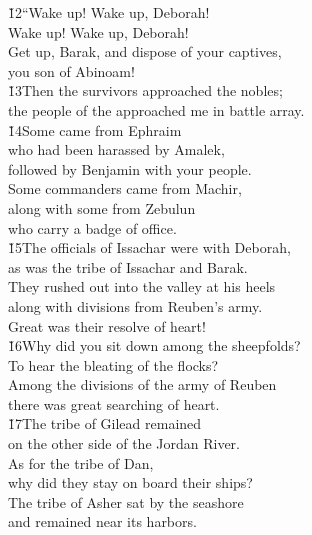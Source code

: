 \begin{poetry}
\poeml \v{12}``Wake up! Wake up, Deborah! \\
\poemll    Wake up! Wake up, Deborah! \\
\poeml Get up, Barak, and dispose of your captives, \\
\poemll    you son of Abinoam! \\
\poeml \v{13}Then the survivors approached the nobles; \\
\poemll    the people of the  approached me in battle array. \\
\poeml \v{14}Some came from Ephraim \\
\poemll    who had been harassed by Amalek, \\
\poemlll       followed by Benjamin with your people. \\
\poeml Some commanders came from Machir, \\
\poemll    along with some from Zebulun \\
\poemlll       who carry a badge of office. \\
\poeml \v{15}The officials of Issachar were with Deborah, \\
\poemll    as was the tribe of Issachar and Barak. \\
\poeml They rushed out into the valley at his heels \\
\poemll    along with divisions from Reuben's army. \\
\poemlll       Great was their resolve of heart! \\
\poeml \v{16}Why did you sit down among the sheepfolds? \\
\poemll    To hear the bleating of the flocks? \\
\poeml Among the divisions of the army of Reuben \\
\poemll    there was great searching of heart. \\
\poeml \v{17}The tribe of Gilead remained \\
\poemll    on the other side of the Jordan River. \\
\poeml As for the tribe of Dan, \\
\poemll    why did they stay on board their ships? \\
\poeml The tribe of Asher sat by the seashore \\
\poemll    and remained near its harbors. \\

\end{poetry}
